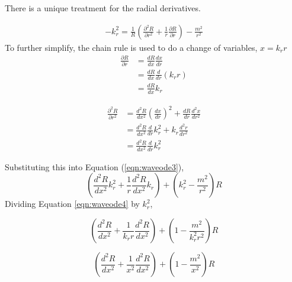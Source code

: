 \begin{frame}
There is a unique treatment for the radial derivatives.


\begin{align*}
    -k_r^2 =\frac{1}{R}
    \left(      
    \frac{\partial^2 R}{\partial r^2 } +
    \frac{1}{r}\frac{\partial R}{\partial r}  
\right) -
    \frac{m^2}{r^2} 
\end{align*}
To further simplify, the chain rule is used to do a change of variables, $x = k_r r$
\begin{align*}
    \frac{\partial R}{\partial r} &= \frac{dR}{dx}\frac{dx}{dr}\\
    &=
    \frac{dR}{dx}\frac{d}{dr}\left( k_r r \right) \\
    &=
    \frac{dR}{dx} k_r 
\end{align*} 


    
\end{frame}
\begin{frame}
    
\begin{align*}
    \frac{\partial^2 R}{\partial r^2} &= \frac{d^2R}{dx^2}\left(\frac{dx}{dr}\right)^2 + 
    \frac{dR}{dr}\frac{d^2x}{dr^2}\\
    &=
    \frac{d^2R}{dx^2}\frac{d}{dr} k_r^2 + k_r \frac{d^2r}{dr^2}\\
    &=
    \frac{d^2R}{dx^2}\frac{d}{dr} k_r^2
\end{align*} 

Substituting this into Equation (\ref{eqn:waveode3}),
\begin{equation}
    \left(\frac{d^2R}{dx^2}k_r^2 +
    \frac{1}{r}\frac{d^2R}{dx^2}k_r\right) +
    \left(k_r^2 - \frac{m^2}{r^2}\right)R
    \label{eqn:waveode4}
\end{equation}
Dividing Equation \ref{eqn:waveode4} by $k_r^2$,

\end{frame}
\begin{frame}
\begin{equation}
    \left(\frac{d^2R}{dx^2} +
    \frac{1}{k_r r}\frac{d^2R}{dx^2}\right) +
    \left(1  - \frac{m^2}{k_r^2 r^2}\right)R
    \label{eqn:waveode5}
\end{equation}

\begin{equation}
    \left(\frac{d^2R}{dx^2} +
    \frac{1}{x^2}\frac{d^2R}{dx^2}\right) +
    \left(1  - \frac{m^2}{x^2}\right)R
    \label{eqn:waveode6}
\end{equation}
\end{frame}
